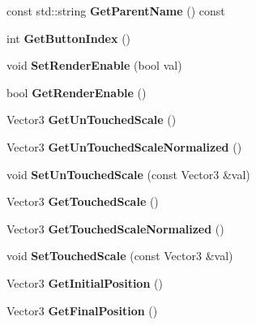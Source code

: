 \begin{DoxyCompactItemize}
const std\+::string {\bfseries Get\+Parent\+Name} () const
\item 
\mbox{\label{classUIComponent_afcd30b071ba3255994029c3fa216d162}} 
int {\bfseries Get\+Button\+Index} ()
\item 
\mbox{\label{classUIComponent_ac91e12dc794bb30f8f867862c49b1410}} 
void {\bfseries Set\+Render\+Enable} (bool val)
\item 
\mbox{\label{classUIComponent_aeb1eb9113d271651453100f4b1bceb5c}} 
bool {\bfseries Get\+Render\+Enable} ()
\item 
\mbox{\label{classUIComponent_a1d49394ef822dd7ce1c2a5ce7b67966f}} 
Vector3 {\bfseries Get\+Un\+Touched\+Scale} ()
\item 
\mbox{\label{classUIComponent_ab38a81650988a482fe95bc593b051569}} 
Vector3 {\bfseries Get\+Un\+Touched\+Scale\+Normalized} ()
\item 
\mbox{\label{classUIComponent_a1c8558f61451d7718ebb63b2105a3e93}} 
void {\bfseries Set\+Un\+Touched\+Scale} (const Vector3 \&val)
\item 
\mbox{\label{classUIComponent_acf70841ffe9f4eacb572121f4f8e5588}} 
Vector3 {\bfseries Get\+Touched\+Scale} ()
\item 
\mbox{\label{classUIComponent_ac857805fd369d969cb06ab60cbfe70ce}} 
Vector3 {\bfseries Get\+Touched\+Scale\+Normalized} ()
\item 
\mbox{\label{classUIComponent_a7920aca794a69343c1e16d1c457c328b}} 
void {\bfseries Set\+Touched\+Scale} (const Vector3 \&val)
\item 
\mbox{\label{classUIComponent_a272f84a2e00097ae8138374896d489ed}} 
Vector3 {\bfseries Get\+Initial\+Position} ()
\item 
\mbox{\label{classUIComponent_a25a886548f331f4668f5ae27faee0e71}} 
Vector3 {\bfseries Get\+Final\+Position} ()
\item 

\end{DoxyCompactItemize}
